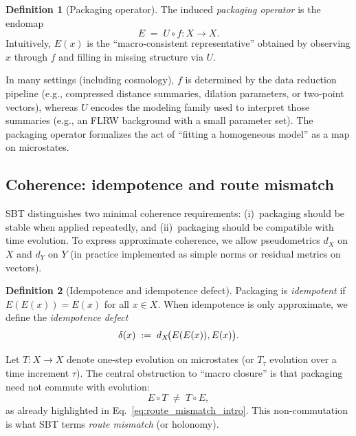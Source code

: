 \documentclass[11pt]{article}
\newcommand{\StateSpace}{X}
\newcommand{\ObsSpace}{Y}
\newcommand{\Lens}{f}              \newcommand{\Completion}{U}        \newcommand{\PackageOp}{E}
\theoremstyle{definition}
\newtheorem{definition}{Definition}[section]
\theoremstyle{plain}
\theoremstyle{remark}
\begin{document}
\begin{definition}[Packaging operator]
The induced \emph{packaging operator} is the endomap
\begin{equation}
\PackageOp \;=\; \Completion\circ \Lens:\StateSpace\to\StateSpace.
\label{eq:packaging_def}
\end{equation}
Intuitively, $\PackageOp(x)$ is the ``macro-consistent representative'' obtained by observing $x$ through $\Lens$ and filling in missing structure via $\Completion$.
\end{definition}

In many settings (including cosmology), $\Lens$ is determined by the data reduction pipeline (e.g., compressed distance summaries, dilation parameters, or two-point vectors), whereas $\Completion$ encodes the modeling family used to interpret those summaries (e.g., an FLRW background with a small parameter set).
The packaging operator formalizes the act of ``fitting a homogeneous model'' as a map on microstates.

\subsection{Coherence: idempotence and route mismatch}\label{sec:framework:mismatch}
SBT distinguishes two minimal coherence requirements: (i)~packaging should be stable when applied repeatedly, and (ii)~packaging should be compatible with time evolution.
To express approximate coherence, we allow pseudometrics $d_{\StateSpace}$ on $\StateSpace$ and $d_{\ObsSpace}$ on $\ObsSpace$ (in practice implemented as simple norms or residual metrics on vectors).

\begin{definition}[Idempotence and idempotence defect]
Packaging is \emph{idempotent} if $\PackageOp(\PackageOp(x))=\PackageOp(x)$ for all $x\in\StateSpace$.
When idempotence is only approximate, we define the \emph{idempotence defect}
\begin{equation}
\iddef(x) \;:=\; d_{\StateSpace}\!\big(\PackageOp(\PackageOp(x)),\PackageOp(x)\big).
\label{eq:idempotence_defect}
\end{equation}
\end{definition}

Let $T:\StateSpace\to\StateSpace$ denote one-step evolution on microstates (or $T_\tau$ evolution over a time increment $\tau$).
The central obstruction to ``macro closure'' is that packaging need not commute with evolution:
\begin{equation}
\PackageOp\circ T \;\neq\; T\circ \PackageOp,
\end{equation}
as already highlighted in Eq.~\eqref{eq:route_mismatch_intro}.
This non-commutation is what SBT terms \emph{route mismatch} (or holonomy).
\end{document}
